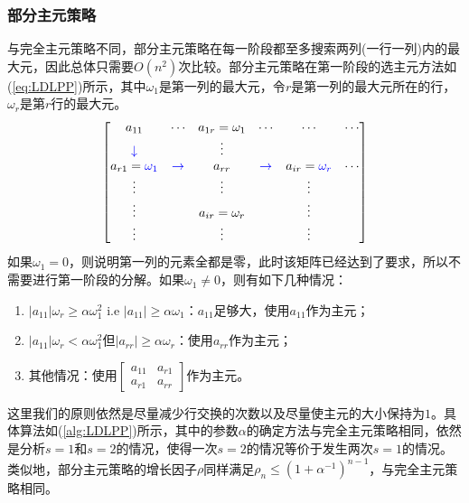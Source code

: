 \documentclass[a4paper,10pt]{ctexart}
\begin{document}
\subsubsection{部分主元策略}
与完全主元策略不同，部分主元策略在每一阶段都至多搜索两列(一行一列)内的最大元，因此总体只需要$ O(n^2) $次比较。部分主元策略在第一阶段的选主元方法如(\ref{eq:LDLPP})所示，其中$ \omega_1 $是第一列的最大元，令$ r $是第一列的最大元所在的行，$ \omega_r $是第$ r $行的最大元。
\begin{equation}\label{eq:LDLPP}
    \begin{bmatrix} 
        a_{11} & \cdots & a_{1r}=\omega_1 & \cdots & \cdots & \cdots \\
        \textcolor{blue}{\downarrow} & & \vdots & & & \\
        a_{r1} = \textcolor{blue}{\omega_1} & \textcolor{blue}{\rightarrow}  & a_{rr} & \textcolor{blue}{\rightarrow} & a_{ir} = \textcolor{blue}{\omega_r} & \cdots \\
        \vdots & & \vdots & & \vdots & \\
        \vdots & & a_{ir} = \omega_r & & \vdots & \\
        \vdots & & \vdots & & \vdots & \\
    \end{bmatrix} 
\end{equation}
如果$ \omega_1=0 $，则说明第一列的元素全都是零，此时该矩阵已经达到了要求，所以不需要进行第一阶段的分解。如果$ \omega_1\ne 0 $，则有如下几种情况：
\begin{enumerate}
    \item $ |a_{11}| \omega_r \geqslant \alpha \omega_1^2 \text{ i.e } |a_{11}|\geqslant \alpha \omega_1 $：$ a_{11} $足够大，使用$ a_{11} $作为主元；
    \item $ |a_{11}| \omega_r < \alpha \omega_1^2 $但$ |a_{rr}|\geqslant \alpha \omega_r $：使用$ a_{rr} $作为主元；
    \item 其他情况：使用$ \begin{bmatrix} 
        a_{11} & a_{r1} \\ a_{r1} & a_{rr} 
    \end{bmatrix}  $作为主元。
\end{enumerate}
这里我们的原则依然是尽量减少行交换的次数以及尽量使主元的大小保持为$ 1 $。具体算法如(\ref{alg:LDLPP})所示，其中的参数$ \alpha $的确定方法与完全主元策略相同，依然是分析$ s=1 $和$ s=2 $的情况，使得一次$ s=2 $的情况等价于发生两次$ s=1 $的情况。类似地，部分主元策略的增长因子$ \rho $同样满足$ \rho_n \leqslant (1+\alpha^{-1})^{n-1} $，与完全主元策略相同。
\end{document}
